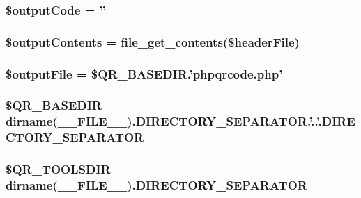 \hypertarget{merge_8php_af6f6877b476d46f61a45ef886ba846ee}{
\subsubsection[{\$output\-Code}]{\setlength{\rightskip}{0pt plus 5cm}\$output\-Code = ''}}\label{merge_8php_af6f6877b476d46f61a45ef886ba846ee}
\hypertarget{merge_8php_a5e82fe2dc648d283b082d2f7cb25c506}{
\subsubsection[{\$output\-Contents}]{\setlength{\rightskip}{0pt plus 5cm}\$output\-Contents = file\-\_\-get\-\_\-contents(\$header\-File)}}\label{merge_8php_a5e82fe2dc648d283b082d2f7cb25c506}
\hypertarget{merge_8php_ad936d9f60325793d1fb7bc155bb36607}{
\subsubsection[{\$output\-File}]{\setlength{\rightskip}{0pt plus 5cm}\$output\-File = \$Q\-R\-\_\-\-B\-A\-S\-E\-D\-I\-R.'phpqrcode.\-php'}}\label{merge_8php_ad936d9f60325793d1fb7bc155bb36607}
\hypertarget{merge_8php_a2b9a0b4d98e1e23a5460e3639fdae91b}{
\subsubsection[{\$\-Q\-R\-\_\-\-B\-A\-S\-E\-D\-I\-R}]{\setlength{\rightskip}{0pt plus 5cm}\$Q\-R\-\_\-\-B\-A\-S\-E\-D\-I\-R = dirname(\-\_\-\-\_\-\-F\-I\-L\-E\-\_\-\-\_\-).D\-I\-R\-E\-C\-T\-O\-R\-Y\-\_\-\-S\-E\-P\-A\-R\-A\-T\-O\-R.'..'.D\-I\-R\-E\-C\-T\-O\-R\-Y\-\_\-\-S\-E\-P\-A\-R\-A\-T\-O\-R}}\label{merge_8php_a2b9a0b4d98e1e23a5460e3639fdae91b}
\hypertarget{merge_8php_ae417e541a5565832b8f420a2a802677e}{
\subsubsection[{\$\-Q\-R\-\_\-\-T\-O\-O\-L\-S\-D\-I\-R}]{\setlength{\rightskip}{0pt plus 5cm}\$Q\-R\-\_\-\-T\-O\-O\-L\-S\-D\-I\-R = dirname(\-\_\-\-\_\-\-F\-I\-L\-E\-\_\-\-\_\-).D\-I\-R\-E\-C\-T\-O\-R\-Y\-\_\-\-S\-E\-P\-A\-R\-A\-T\-O\-R}}\label{merge_8php_ae417e541a5565832b8f420a2a802677e}
